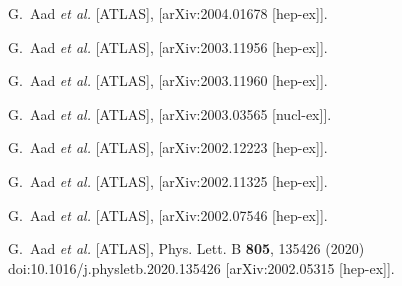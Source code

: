 \begin{thebibliography}{9}
G.~Aad \textit{et al.} [ATLAS],
[arXiv:2004.01678 [hep-ex]].

G.~Aad \textit{et al.} [ATLAS],
[arXiv:2003.11956 [hep-ex]].

G.~Aad \textit{et al.} [ATLAS],
[arXiv:2003.11960 [hep-ex]].

G.~Aad \textit{et al.} [ATLAS],
[arXiv:2003.03565 [nucl-ex]].

G.~Aad \textit{et al.} [ATLAS],
[arXiv:2002.12223 [hep-ex]].

G.~Aad \textit{et al.} [ATLAS],
[arXiv:2002.11325 [hep-ex]].

G.~Aad \textit{et al.} [ATLAS],
[arXiv:2002.07546 [hep-ex]].

G.~Aad \textit{et al.} [ATLAS],
Phys. Lett. B \textbf{805}, 135426 (2020)
doi:10.1016/j.physletb.2020.135426
[arXiv:2002.05315 [hep-ex]].


\end{thebibliography}
